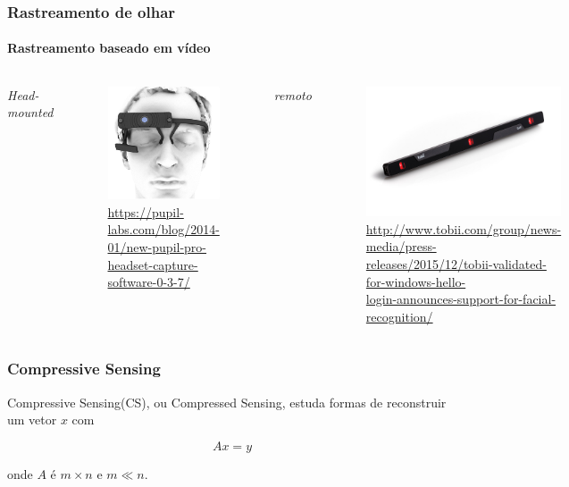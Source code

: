 \documentclass[11pt]{beamer}
\begin{document}
\begin{frame}
\frametitle{Rastreamento de olhar}
\framesubtitle{Rastreamento baseado em vídeo}
\begin{columns}[t]
\centering
\textit{Head-mounted}
\begin{figure}
\includegraphics[scale=.6]{imagens/pupil.png}
\caption{\tiny{\url{https://pupil-labs.com/blog/2014-01/new-pupil-pro-headset-capture-software-0-3-7/}}}
\end{figure}
\centering
\textit{remoto}
\begin{figure}
\includegraphics[scale=1]{imagens/eyex.jpg}
\caption{\tiny{\url{http://www.tobii.com/group/news-media/press-releases/2015/12/tobii-validated-for-windows-hello-}\\\url{login-announces-support-for-facial-recognition/}}}
\end{figure}
\end{columns}
\end{frame}

\begin{frame}
\frametitle{Compressive Sensing}
Compressive Sensing(CS), ou Compressed Sensing, estuda formas de reconstruir um vetor $x$ com

$$ Ax = y$$

onde $A$ é $m \times n$ e $m \ll n$.
\end{frame}
\end{document}
